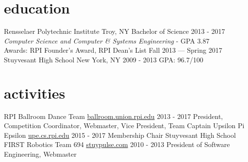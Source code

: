 \documentclass[]{friggeri-cv}
\begin{document}
\section{education}

\begin{entrylist}
  \entryheader
    {Rensselaer Polytechnic Institute}
    {Troy, NY}
  \entry
    {Bachelor of Science}
    {2013 - 2017}
    {\vspace{10pt}\emph{Computer Science and Computer \& Systems Engineering} - GPA 3.87\\
    Awards: RPI Founder's Award, RPI Dean's List Fall 2013 --- Spring 2017}
  \entryheader
    {Stuyvesant High School}
    {New York, NY}
  \entry
    {}
    {2009 - 2013}
    {GPA: 96.7/100}
\end{entrylist}

\section{activities}

\begin{entrylist}
  \entryheader
    {RPI Ballroom Dance Team}
    {\href{http://ballroom.union.rpi.edu}{ballroom.union.rpi.edu} 2013 - 2017}
  \entrynoheader
    {President, Competition Coordinator, Webmaster, Vice President, Team Captain}
  \entryheader
    {Upsilon Pi Epsilon}
    {\href{http://upe.cs.rpi.edu}{upe.cs.rpi.edu} 2015 - 2017}
  \entrynoheader
    {Membership Chair}
  \entryheader
    {Stuyvesant High School FIRST Robotics Team 694}
    {\href{http://stuypulse.com}{stuypulse.com} 2010 - 2013}
  \entrynoheader
    {President of Software Engineering, Webmaster}
\end{entrylist}
\end{document}
